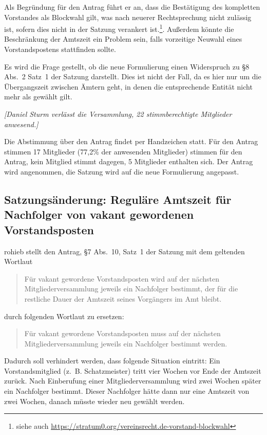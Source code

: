 \documentclass[a4paper,12pt]{scrartcl}
\begin{document}
Als Begründung für den Antrag führt er an, dass die Bestätigung des kompletten
Vorstandes als Blockwahl gilt, was nach neuerer Rechtsprechung nicht zulässig
ist, sofern dies nicht in der Satzung verankert ist.\footnote{siehe auch 
\url{https://stratum0.org/vereinsrecht.de-vorstand-blockwahl}}.
Außerdem könnte die Beschränkung der Amtszeit ein Problem sein, falls vorzeitige
Neuwahl eines Vorstandspostens stattfinden sollte.

Es wird die Frage gestellt, ob die neue Formulierung einen Widerspruch zu §8
Abs.~2 Satz~1 der Satzung darstellt. Dies ist nicht der Fall, da es hier nur um
die Übergangszeit zwischen Ämtern geht, in denen die entsprechende Entität nicht
mehr als gewählt gilt.

\emph{[Daniel Sturm verlässt die Versammlung, 22 stimmberechtigte Mitglieder
anwesend.]}

Die Abstimmung über den Antrag findet per Handzeichen statt. Für den Antrag
stimmen 17 Mitglieder (77{,}2\% der anwesenden Mitglieder) stimmen für den
Antrag, kein Mitglied stimmt dagegen, 5 Mitglieder enthalten sich. Der
Antrag wird angenommen, die Satzung wird auf die neue Formulierung angepasst.

\subsection{Satzungsänderung: Reguläre Amtszeit für Nachfolger von vakant
gewordenen Vorstandsposten}

rohieb stellt den Antrag, §7 Abs.~10, Satz~1 der Satzung mit dem geltenden
Wortlaut
\begin{quote}
  Für vakant gewordene Vorstandsposten wird auf der nächsten
  Mitgliederversammlung jeweils ein Nachfolger bestimmt, der für die restliche
  Dauer der Amtszeit seines Vorgängers im Amt bleibt.
\end{quote}
durch folgenden Wortlaut zu ersetzen:
\begin{quote}
  Für vakant gewordene Vorstandsposten muss auf der nächsten
  Mitgliederversammlung jeweils ein Nachfolger bestimmt werden.
\end{quote}

Dadurch soll verhindert werden, dass folgende Situation eintritt: Ein
Vorstandsmitglied (z.~B. Schatzmeister) tritt vier Wochen vor Ende der Amtszeit
zurück. Nach Einberufung einer Mitgliederversammlung wird zwei Wochen später ein
Nachfolger bestimmt. Dieser Nachfolger hätte dann nur eine Amtszeit von zwei
Wochen, danach müsste wieder neu gewählt werden.
\end{document}
